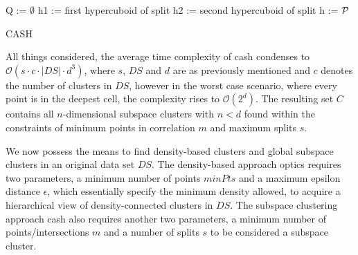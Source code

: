 \vspace{5mm}
\begin{algorithm}[H]
\SetAlgoLined
{}
Q := $\emptyset$\;     
h1 := first hypercuboid of split\;
h2 := second hypercuboid of split\;
h := $\mathcal{P}$

 \caption{CASH}
\end{algorithm}
\vspace{5mm}

All things considered, the average time complexity of \gls{cash} condenses to $\mathcal{O}(s \cdot c \cdot |DS| \cdot d^3)$, where $s$, $DS$ and $d$ are as previously mentioned and $c$ denotes the number of clusters in $DS$, however in the worst case scenario, where every point is in the deepest cell, the complexity rises to $\mathcal{O}(2^d)$. The resulting set $C$ contains all $n$-dimensional subspace clusters with $n < d$ found within the constraints of minimum points in correlation $m$ and maximum splits $s$.\\

We now possess the means to find density-based clusters and global subspace clusters in an original data set $DS$. The density-based approach \gls{optics} requires two parameters, a minimum number of points $minPts$ and a maximum epsilon distance $\epsilon$, which essentially specify the minimum density allowed, to acquire a hierarchical view of density-connected clusters in $DS$. The subspace clustering approach \gls{cash} also requires another two parameters, a minimum number of points/intersections $m$ and a number of splits $s$ to be considered a subspace cluster.


